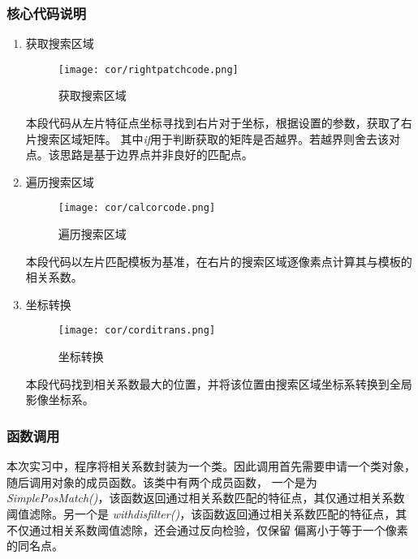     \subsubsection{核心代码说明}
        \begin{enumerate}
            \item 获取搜索区域
            
            \begin{figure}[H]
                \centering 
                \texttt{[image: cor/rightpatchcode.png]}
                \caption{获取搜索区域}
            \end{figure}

            \hspace{20pt}本段代码从左片特征点坐标寻找到右片对于坐标，根据设置的参数，获取了右片搜索区域矩阵。
            其中\textit{if}用于判断获取的矩阵是否越界。若越界则舍去该对点。该思路是基于边界点并非良好的匹配点。

            \item 遍历搜索区域
            
            \begin{figure}[H]
                \centering 
                \texttt{[image: cor/calcorcode.png]}
                \caption{遍历搜索区域}
            \end{figure}

            \hspace{20pt}本段代码以左片匹配模板为基准，在右片的搜索区域逐像素点计算其与模板的相关系数。

            \item 坐标转换
            
            \begin{figure}[H]
                \centering 
                \texttt{[image: cor/corditrans.png]}
                \caption{坐标转换}
            \end{figure}

            \hspace{20pt}本段代码找到相关系数最大的位置，并将该位置由搜索区域坐标系转换到全局影像坐标系。

        \end{enumerate}


    \subsubsection{函数调用}
        本次实习中，程序将相关系数封装为一个类。因此调用首先需要申请一个类对象，随后调用对象的成员函数。该类中有两个成员函数，
        一个是为\textit{SimplePosMatch()}，该函数返回通过相关系数匹配的特征点，其仅通过相关系数阈值滤除。另一个是
        \textit{withdisfilter()}，该函数返回通过相关系数匹配的特征点，其不仅通过相关系数阈值滤除，还会通过反向检验，仅保留
        偏离小于等于一个像素的同名点。

